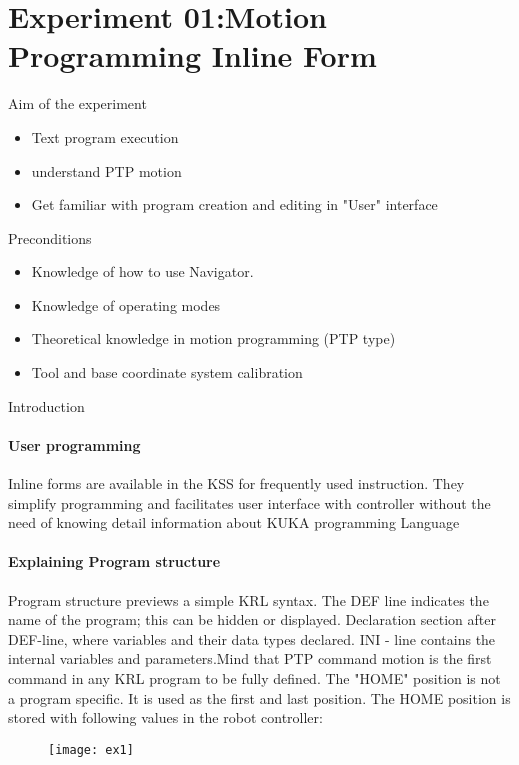 %
%
%
%
%
\section{Experiment 01:Motion Programming Inline Form}
Aim of the experiment
\begin{itemize}
	\item Text program execution
	\item understand PTP motion
	\item Get familiar with program creation and editing in "User" interface
\end{itemize}
Preconditions
\begin{itemize}
	\item Knowledge of how to use Navigator.
	\item Knowledge of operating modes
	\item Theoretical knowledge in motion programming (PTP type)
	\item Tool and base coordinate system calibration
\end{itemize}
Introduction
\paragraph{User programming}
Inline forms are available in the KSS for frequently used instruction. They simplify programming and facilitates user interface with controller without the need of knowing detail information about KUKA programming Language
\paragraph{Explaining Program structure}
Program structure previews a simple KRL syntax. The DEF line indicates the name of the program; this can be hidden or displayed. Declaration section after DEF-line, where variables and their data types declared.
INI - line contains the internal variables and parameters.Mind that PTP command motion is the first command in any KRL program to be fully defined. The "HOME" position is not a program specific. It is used as the first and last position. The HOME position is stored with following values in the robot controller:
\begin{figure}[H]
	
	\texttt{[image: ex1]}
\end{figure}


